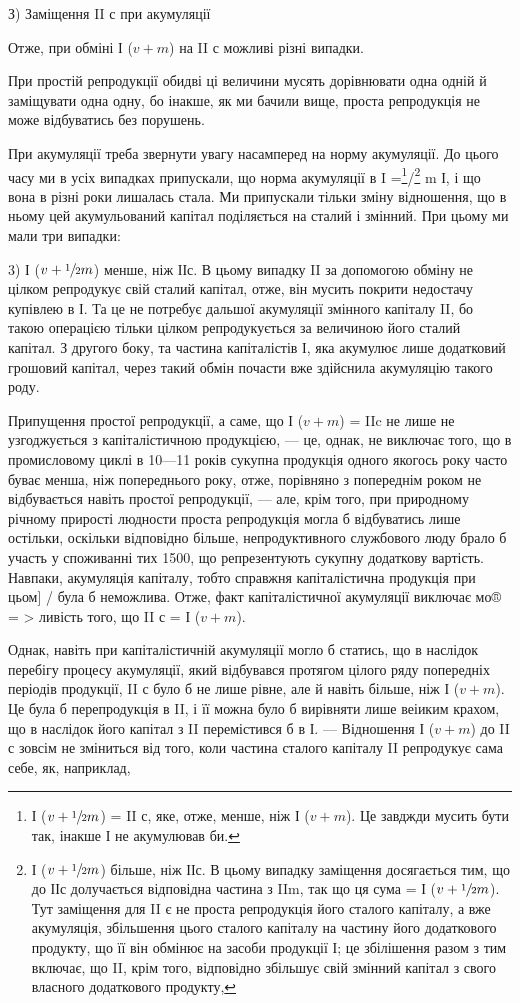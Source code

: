 З) Заміщення II с при акумуляції

Отже, при обміні І ($v + m$) на II с можливі різні випадки.

При простій репродукції обидві ці величини мусять дорівнювати одна
одній й заміщувати одна одну, бо інакше, як ми бачили вище, проста
репродукція не може відбуватись без порушень.

При акумуляції треба звернути увагу насамперед на норму акумуляції.
До цього часу ми в усіх випадках припускали, що норма акумуляції в
I =\footnote{
І ($v + \sfrac{1}{2}m$) = II с, яке, отже, менше, ніж І ($v + m$). Це завджди
мусить бути так, інакше І не акумулював би.
}/\footnote{
І ($v + \sfrac{1}{2}m$) більше, ніж ІІс. В цьому випадку заміщення досягається
тим, що до ІІс долучається відповідна частина з IIm, так що
ця сума = І ($v + \sfrac{1}{2} m$). Тут заміщення для II є не проста репродукція
його сталого капіталу, а вже акумуляція, збільшення цього сталого капіталу
на частину його додаткового продукту, що її він обмінює на засоби
продукції І; це збілішення разом з тим включає, що II, крім того, відповідно
збільшує свій змінний капітал з свого власного додаткового продукту,
} m І, і що вона в різні роки лишалась стала. Ми припускали
тільки зміну відношення, що в ньому цей акумульований капітал поділяється
на сталий і змінний. При цьому ми мали три випадки:

3) І ($v + \sfrac{1}{2}m$) менше, ніж ІІс. В цьому випадку II за допомогою
обміну не цілком репродукує свій сталий капітал, отже, він мусить покрити
недостачу купівлею в І. Та це не потребує дальшої акумуляції
змінного капіталу II, бо такою операцією тільки цілком репродукується
за величиною його сталий капітал. З другого боку, та частина капіталістів
І, яка акумулює лише додатковий грошовий капітал, через такий
обмін почасти вже здійснила акумуляцію такого роду.

Припущення простої репродукції, а саме, що І ($v + m$) = IIc не лише
не узгоджується з капіталістичною продукцією, — це, однак, не виключає
того, що в промисловому циклі в 10—11 років сукупна продукція одного
якогось року часто буває менша, ніж попереднього року, отже,
порівняно з попереднім роком не відбувається навіть простої репродукції,
— але, крім того, при природному річному прирості людности проста
репродукція могла б відбуватись лише остільки, оскільки відповідно
більше, непродуктивного службового люду брало б участь у споживанні
тих 1500, що репрезентують сукупну додаткову вартість. Навпаки, акумуляція
капіталу, тобто справжня капіталістична продукція при цьом] /
була б неможлива. Отже, факт капіталістичної акумуляції виключає мо® = >
ливість того, що II с = І ($v + m$).

Однак, навіть при капіталістичній акумуляції могло б статись, що в
наслідок перебігу процесу акумуляції, який відбувався протягом цілого
ряду попередніх періодів продукції, II с було б не лише рівне, але й навіть
більше, ніж І ($v + m$). Це була б перепродукція в II, і її можна було б
вирівняти лише веіиким крахом, що в наслідок його капітал з II перемістився
б в І. — Відношення І ($v + m$) до II с зовсім не зміниться від того,
коли частина сталого капіталу II репродукує сама себе, як, наприклад,
\parbreak{}  %
